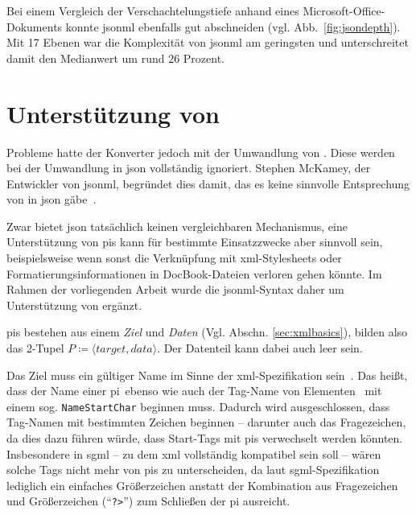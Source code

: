 Bei einem Vergleich der Verschachtelungstiefe anhand eines Microsoft\hyp{}Office\hyp{}Dokuments konnte \acrshort{jsonml} ebenfalls gut abschneiden (vgl. Abb.~\ref{fig:jsondepth}). Mit 17 Ebenen war die Komplexität von \acrshort{jsonml} am geringsten und unterschreitet damit den Medianwert um rund 26 Prozent.

\section{Unterstützung von }

Probleme hatte der Konverter jedoch mit der Umwandlung von . Diese werden bei der Umwandlung in \acrshort{json} vollständig ignoriert. Stephen McKamey, der Entwickler von \acrshort{jsonml}, begründet dies damit, das es keine sinnvolle Entsprechung von  in \acrshort{json} gäbe~\cite{mckamey2006xml}.

Zwar bietet \acrshort{json} tatsächlich keinen vergleichbaren Mechanismus, eine Unterstützung von \glspl{pi} kann für bestimmte Einsatzzwecke aber sinnvoll sein, beispielsweise wenn sonst die Verknüpfung mit \acrshort{xml}-Stylesheets oder Formatierungsinformationen in DocBook\hyp{}Dateien verloren gehen könnte. Im Rahmen der vorliegenden Arbeit wurde die \acrshort{jsonml}-Syntax daher um Unterstützung von  ergänzt.

\glspl{pi} bestehen aus einem \emph{Ziel} und \emph{Daten} (Vgl. Abschn. \ref{sec:xmlbasics}), bilden also das 2-Tupel $P \coloneqq \langle target, data \rangle$. Der Datenteil kann dabei auch leer sein.

Das Ziel muss ein gültiger Name im Sinne der \acrshort{xml}-Spezifikation sein~\cite[{Regel~[17]}]{xml}. Das heißt, dass der Name einer \gls{pi}\ ebenso wie auch der Tag-Name von Elementen~\cite[{Regel~[40]}]{xml} mit einem sog. \texttt{NameStartChar} beginnen muss. Dadurch wird ausgeschlossen, dass Tag-Namen mit bestimmten Zeichen beginnen -- darunter auch das Fragezeichen, da dies dazu führen würde, dass Start-Tags mit \glspl{pi} verwechselt werden könnten. Insbesondere in \acrshort{sgml} -- zu dem \acrshort{xml} vollständig kompatibel sein soll -- wären solche Tags nicht mehr von \glspl{pi} zu unterscheiden, da laut \acrshort{sgml}-Spezifikation lediglich ein einfaches Größerzeichen anstatt der Kombination aus Fragezeichen und Größerzeichen (\enquote{\texttt{?>}}) zum Schließen der \gls{pi} ausreicht.

